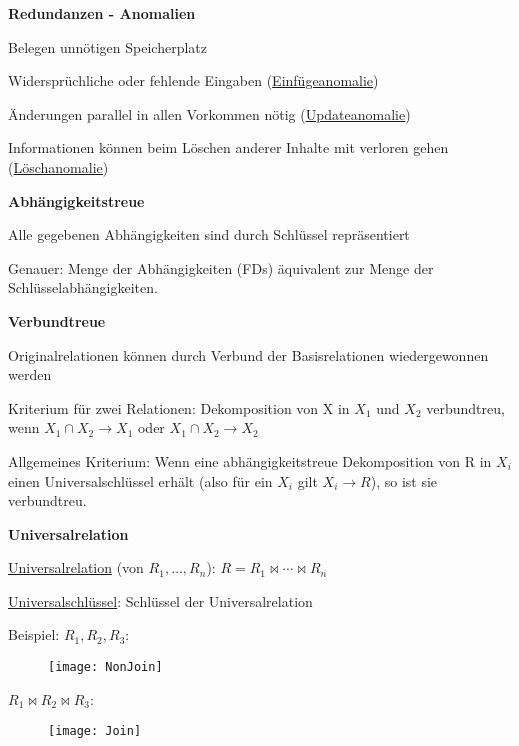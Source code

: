 \textbf{Redundanzen - Anomalien}
\begin{items}
	\item Belegen unnötigen Speicherplatz
	\item Widersprüchliche oder fehlende Eingaben (\underline{Einfügeanomalie})
	\item Änderungen parallel in allen Vorkommen nötig (\underline{Updateanomalie})
	\item Informationen können beim Löschen anderer Inhalte mit verloren gehen (\underline{Löschanomalie})
\end{items}

\textbf{Abhängigkeitstreue}
\begin{items}
	\item Alle gegebenen Abhängigkeiten sind durch Schlüssel repräsentiert
	\item Genauer: Menge der Abhängigkeiten (FDs) äquivalent zur Menge der Schlüsselabhängigkeiten.
\end{items}

\textbf{Verbundtreue}
\begin{items}
	\item Originalrelationen können durch Verbund der Basisrelationen wiedergewonnen werden
	\item Kriterium für zwei Relationen:
	Dekomposition von X in $X_1$ und $X_2$ verbundtreu, wenn $X_1 \cap X_2 \to X_1$ oder $X_1 \cap X_2 \to X_2$
	\item Allgemeines Kriterium: 
	Wenn eine abhängigkeitstreue Dekomposition von R in $X_i$ einen Universalschlüssel erhält (also für ein $X_i$ gilt $X_i \to R$), so ist sie verbundtreu.
\end{items}

\textbf{Universalrelation}
\begin{items}
	\item \underline{Universalrelation} (von \( R_1, \dots, R_n \)): \( R = R_1 \bowtie \cdots \bowtie R_n \)
	\item \underline{Universalschlüssel}: Schlüssel der Universalrelation
	\item Beispiel: \( R_1, R_2, R_3 \):
	\begin{figure}[H]\centering\label{NonJoin}\texttt{[image: NonJoin]}\end{figure}
	\item \quad \( R_1 \bowtie R_2 \bowtie R_3 \):
	\begin{figure}[H]\centering\label{Join}\texttt{[image: Join]}\end{figure}
\end{items}

